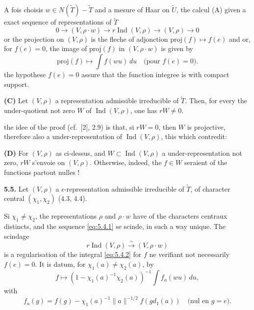 \documentclass[12pt,a4paper]{article}
\theoremstyle{plain}
\theoremstyle{definition}
\theoremstyle{remark}
\DeclareMathOperator{\Ind}{Ind}
\newcommand{\wt}{\widetilde}
\begin{document}
A fois choisis $w \in N(\wt{T}) - \wt{T}$ and a mesure of Haar on $\wt{U}$, the calcul (A) given a exact sequence of representations of $\wt{T}$
\begin{equation}\label{eq:5.4.1}
0 \longrightarrow (V, \rho \cdot w) \longrightarrow r \Ind(V, \rho) \longrightarrow (V, \rho) \longrightarrow 0
\tag{5.4.1}
\end{equation}
or the projection on $(V, \rho)$ is the fleche of adjonction $\mathrm{proj}(f) \mapsto f(e)$ and or, for $f(e) = 0$, the image of $\mathrm{proj}(f)$ in $(V, \rho \cdot w)$ is given by
\begin{equation}\label{eq:5.4.2}
\mathrm{proj}(f) \longmapsto \int f(wu) \, du \quad \text{(pour } f(e) = 0\text{).}
\tag{5.4.2}
\end{equation}
the hypothese $f(e) = 0$ assure that the function integree is with compact support.

\textbf{(C)} Let $(V, \rho)$ a representation admissible irreducible of $\wt{T}$. Then, for every the under-quotient not zero $W$ of $\Ind(V, \rho)$, one has $rW \neq 0$.

the idee of the proof (cf.\ [2], 2.9) is that, si $rW = 0$, then $W$ is projective, therefore also a under-representation of $\Ind(V, \rho)$, this which contredit:

\textbf{(D)} For $(V, \rho)$ as ci-dessus, and $W \subset \Ind(V, \rho)$ a under-representation not zero, $rW$ s'envoie on $(V, \rho)$. Otherwise, indeed, the $f \in W$ seraient of the functions partout nulles !

\textbf{5.5.} Let $(V, \rho)$ a $\epsilon$-representation admissible irreducible of $\wt{T}$, of character central $(\chi_1, \chi_2)$ (4.3, 4.4).

Si $\chi_1 \neq \chi_2$, the representations $\rho$ and $\rho \cdot w$ have of the characters centraux distincts, and the sequence \eqref{eq:5.4.1} se scinde, in such a way unique. The scindage
\begin{equation}\label{eq:5.5.1}
r \Ind(V, \rho) \xrightarrow{\sim} (V, \rho \cdot w)
\tag{5.5.1}
\end{equation}
is a regularisation of the integral \eqref{eq:5.4.2} for $f$ ne verifiant not necessarily $f(e) = 0$. It is datum, for $\chi_1(a) \neq \chi_2(a)$, by
\begin{equation}\label{eq:5.5.2}
f \longmapsto (1 - \chi_1(a)^{-1} \chi_2(a))^{-1} \int f_a(wu) \, du,
\tag{5.5.2}
\end{equation}
with
\[
f_a(g) = f(g) - \chi_1(a)^{-1} \|a\|^{-1/2} f(g d_1(a)) \quad \text{(nul en } g = e\text{).}
\]
\end{document}
